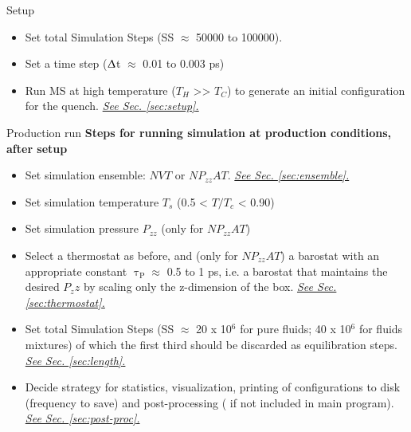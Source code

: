 \documentclass[9pt,bestpractices]{livecoms}
\newcommand{\checkref}[1]{\uline{\emph{{\color{LiveCoMSDarkBlue}#1}}}}
\begin{document}
\begin{Checklists*}[p!]
\begin{checklist}{Setup}
\begin{itemize}
\item Set total Simulation Steps (SS ${\approx}$ 50000 to 100000). \\
\item Set a time step (${\Updelta}$t ${\approx}$ 0.01 to 0.003 ps) \\
\item Run MS at high temperature ($T_{H}$ {\textgreater}{\textgreater} $T_{C}$) to generate an initial configuration for the quench. \checkref{See Sec. \ref{sec:setup}.} \\
\end{itemize}
\end{checklist}

\begin{checklist}{Production run}
\textbf{Steps for running simulation at production conditions, after setup}
\begin{itemize}
  \item Set simulation ensemble: $NVT$ or $NP_{zz}AT$. \checkref{See Sec. \ref{sec:ensemble}.} \\
\item Set simulation temperature $T_{s}$ (0.5 {\textless} $T/T_{c}$ {\textless} 0.90)  \\
\item Set simulation pressure $P_{zz}$ (only for $NP_{zz}AT$) \\
\item Select a thermostat as before, and (only for $NP_{zz}AT$) a barostat with an appropriate constant ${\uptau}_{\mathrm{P}}{\approx}$ 0.5 to 1 ps, i.e. a barostat that maintains the desired $P_zz$ by scaling only the z-dimension of the box. \checkref{See Sec. \ref{sec:thermostat}.}\\
\item Set total Simulation Steps (SS ${\approx}$ 20 x 10$^{6}$ for pure fluids; 40 x 10$^{6}$ for fluids mixtures) of which the first third should be discarded as equilibration steps. \checkref{See Sec. \ref{sec:length}.} \\
\item Decide strategy for statistics, visualization, printing of configurations to disk (frequency to save) and post-processing ( if not included in main program). \checkref{See Sec. \ref{sec:post-proc}.}\\
\end{itemize}
\end{checklist}


\end{Checklists*}

\clearpage





\end{document}
